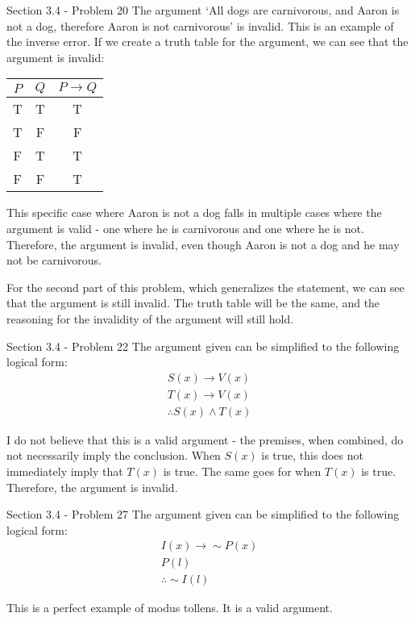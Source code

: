 \documentclass[12pt]{article}
\begin{document}
\begin{problem}{Section 3.4 - Problem 20}
The argument `All dogs are carnivorous, and Aaron is not a dog, therefore Aaron is not carnivorous' is invalid.
This is an example of the inverse error. If we create a truth table for the argument, we can see that the argument is invalid:

\begin{center}
	\begin{tabular}{| c c | c |}
		\hline
		$P$ & $Q$ & $P \rightarrow Q$ \\
		\hline
		T   & T   & T                 \\
		T   & F   & F                 \\
		F   & T   & T                 \\
		F   & F   & T                 \\
		\hline
	\end{tabular}
\end{center}

This specific case where Aaron is not a dog falls in multiple cases where the argument is valid - one where he is carnivorous and one where he is not.
Therefore, the argument is invalid, even though Aaron is not a dog and he may not be carnivorous.

For the second part of this problem, which generalizes the statement, we can see that the argument is still invalid. The truth table will be the same,
and the reasoning for the invalidity of the argument will still hold.
\end{problem}

\begin{problem}{Section 3.4 - Problem 22}
The argument given can be simplified to the following logical form:
\begin{equation*}
	\begin{split}
		S(x) \rightarrow V(x) \\
		T(x) \rightarrow V(x) \\
		\hline
		\therefore S(x) \wedge T(x)
	\end{split}
\end{equation*}

I do not believe that this is a valid argument - the premises, when combined, do not necessarily imply the conclusion.
When $S(x)$ is true, this does not immediately imply that $T(x)$ is true. The same goes for when $T(x)$ is true. Therefore,
the argument is invalid.
\end{problem}

\begin{problem}{Section 3.4 - Problem 27}
The argument given can be simplified to the following logical form:
\begin{equation*}
	\begin{split}
		I(x) \rightarrow \sim P(x) \\
		P(l)                       \\
		\hline
		\therefore \sim I(l)
	\end{split}
\end{equation*}

This is a perfect example of modus tollens. It is a valid argument.
\end{problem}
\end{document}
